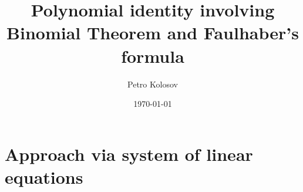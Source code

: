 \documentclass[12pt,letterpaper,oneside,reqno]{amsart}
\title[Polynomial identity involving Binomial Theorem and Faulhaber's formula]
{Polynomial identity involving Binomial Theorem and Faulhaber's formula}
\author[Petro Kolosov]{Petro Kolosov}
\date{\today}
\numberwithin{equation}{section}
\begin{document}
    \maketitle

    \tableofcontents


    \section{Approach via system of linear equations}\label{sec:approach-via-system-of-linear-equations}
    
    
    
    
    
%
%
%    
%
%
%    
%
%
%    
%
%
%    
%
%
%    
%
%
%    

%    
\end{document}
